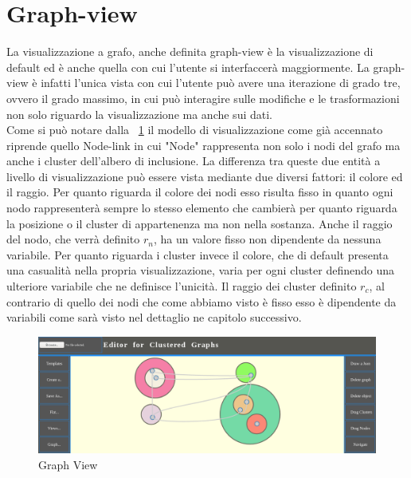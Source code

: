 {\section{Graph-view}
La visualizzazione a grafo, anche definita graph-view è la visualizzazione di default ed è anche quella con cui l'utente si interfaccerà maggiormente. La graph-view è infatti l'unica vista con cui l'utente può avere una iterazione di grado tre, ovvero il grado massimo, in cui può interagire sulle modifiche e le trasformazioni non solo riguardo la visualizzazione ma anche sui dati.\\
Come si può notare dalla \figurename~\ref{fig:graphView} il modello di visualizzazione come già accennato riprende quello Node-link in cui "Node" rappresenta non solo i nodi del grafo ma anche i cluster dell'albero di inclusione. La differenza tra queste due entità a livello di visualizzazione può essere vista mediante due diversi fattori: il colore ed il raggio.
Per quanto riguarda il colore dei nodi esso risulta fisso in quanto ogni nodo rappresenterà sempre lo stesso elemento che cambierà per quanto riguarda la posizione o il cluster di appartenenza ma non nella sostanza. Anche il raggio del nodo, che verrà definito $r_n$, ha un valore fisso non dipendente da nessuna variabile.
Per quanto riguarda i cluster invece il colore, che di default presenta una casualità nella propria visualizzazione, varia per ogni cluster definendo una ulteriore variabile che ne definisce l'unicità.
Il raggio dei cluster definito $r_c$, al contrario di quello dei nodi che come abbiamo visto è fisso esso è dipendente da variabili come sarà visto nel dettaglio ne capitolo successivo.
\begin{figure}[!htb]
	\begin{center}
		\includegraphics[width=1 \linewidth]{figure/graphView}
	\end{center}
	\caption{Graph View\label{fig:graphView}}
\end{figure}

}
